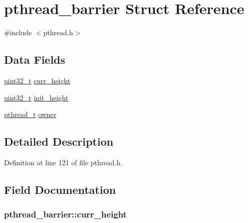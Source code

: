 \hypertarget{structpthread__barrier}{\section{pthread\+\_\+barrier Struct Reference}
\label{structpthread__barrier}
}


{\ttfamily \#include $<$pthread.\+h$>$}

\subsection*{Data Fields}
\begin{DoxyCompactItemize}
\item 
\hyperlink{aplus_8h_a53a0df51603c77c2aa5b9ea61b606a82}{uint32\+\_\+t} \hyperlink{structpthread__barrier_a3b8e6f276f11a62fb77525fe5d11b18c}{curr\+\_\+height}
\item 
\hyperlink{aplus_8h_a53a0df51603c77c2aa5b9ea61b606a82}{uint32\+\_\+t} \hyperlink{structpthread__barrier_a71938bf4346ecc8a2f997f18df267ae0}{init\+\_\+height}
\item 
\hyperlink{pthread_8h_a6766c2345d5c6fe6407d9f6b844e584a}{pthread\+\_\+t} \hyperlink{structpthread__barrier_a8ec820115bfcd6be50432579aac440fa}{owner}
\end{DoxyCompactItemize}


\subsection{Detailed Description}


Definition at line 121 of file pthread.\+h.



\subsection{Field Documentation}
\hypertarget{structpthread__barrier_a3b8e6f276f11a62fb77525fe5d11b18c}{
\subsubsection[{curr\+\_\+height}]{ pthread\+\_\+barrier\+::curr\+\_\+height}}\label{structpthread__barrier_a3b8e6f276f11a62fb77525fe5d11b18c}


